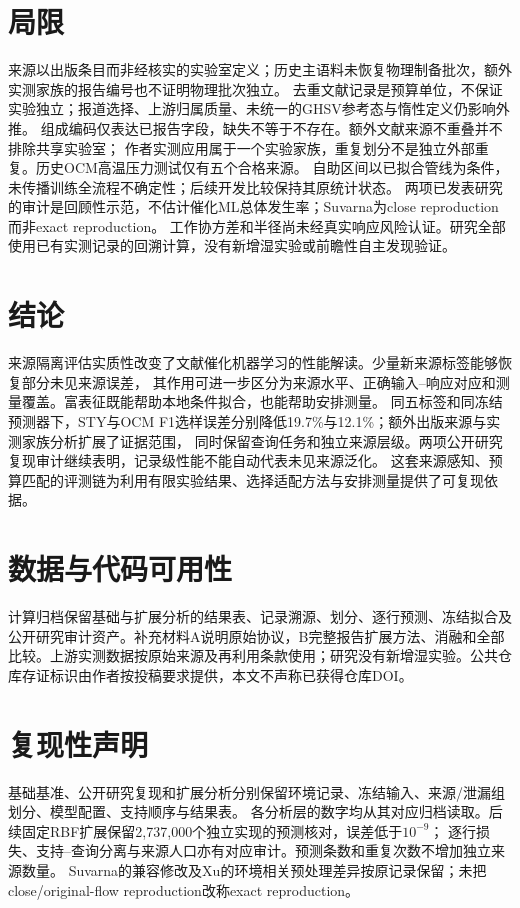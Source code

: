 \documentclass[11pt,a4paper]{article}
\begin{document}
\section{局限}
来源以出版条目而非经核实的实验室定义；历史主语料未恢复物理制备批次，额外实测家族的报告编号也不证明物理批次独立。
去重文献记录是预算单位，不保证实验独立；报道选择、上游归属质量、未统一的GHSV参考态与惰性定义仍影响外推。
组成编码仅表达已报告字段，缺失不等于不存在。额外文献来源不重叠并不排除共享实验室；
作者实测应用属于一个实验家族，重复划分不是独立外部重复。历史OCM高温压力测试仅有五个合格来源。
自助区间以已拟合管线为条件，未传播训练全流程不确定性；后续开发比较保持其原统计状态。
两项已发表研究的审计是回顾性示范，不估计催化ML总体发生率；Suvarna为close reproduction而非exact reproduction。
工作协方差和半径尚未经真实响应风险认证。研究全部使用已有实测记录的回溯计算，没有新增湿实验或前瞻性自主发现验证。

\section{结论}
来源隔离评估实质性改变了文献催化机器学习的性能解读。少量新来源标签能够恢复部分未见来源误差，
其作用可进一步区分为来源水平、正确输入--响应对应和测量覆盖。富表征既能帮助本地条件拟合，也能帮助安排测量。
同五标签和同冻结预测器下，STY与OCM F1选样误差分别降低19.7\%与12.1\%；额外出版来源与实测家族分析扩展了证据范围，
同时保留查询任务和独立来源层级。两项公开研究复现审计继续表明，记录级性能不能自动代表未见来源泛化。
这套来源感知、预算匹配的评测链为利用有限实验结果、选择适配方法与安排测量提供了可复现依据。

\section*{数据与代码可用性}
计算归档保留基础与扩展分析的结果表、记录溯源、划分、逐行预测、冻结拟合及公开研究审计资产。补充材料A说明原始协议，B完整报告扩展方法、消融和全部比较。上游实测数据按原始来源及再利用条款使用；研究没有新增湿实验。公共仓库存证标识由作者按投稿要求提供，本文不声称已获得仓库DOI。

\section*{复现性声明}
基础基准、公开研究复现和扩展分析分别保留环境记录、冻结输入、来源/泄漏组划分、模型配置、支持顺序与结果表。
各分析层的数字均从其对应归档读取。后续固定RBF扩展保留2,737,000个独立实现的预测核对，误差低于$10^{-9}$；
逐行损失、支持--查询分离与来源人口亦有对应审计。预测条数和重复次数不增加独立来源数量。
Suvarna的兼容修改及Xu的环境相关预处理差异按原记录保留；未把close/original-flow reproduction改称exact reproduction。


\end{document}
